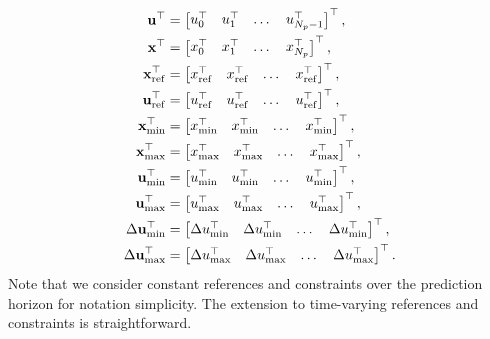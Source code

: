 \documentclass[a4paper,12pt,fleqn]{article}
\newcommand{\varxvec}{\mathbf{x}}
\newcommand{\varuvec}{\mathbf{u}}
\newcommand{\Np}{{N_p}}
\begin{document}
\begin{subequations}
\begin{align}
 \varuvec^\top &= \begin{bmatrix} u_0^\top &u_1^\top &\dots& u_{\Np-1}^\top\end{bmatrix}^\top,\\
 \varxvec^\top &= \begin{bmatrix} x_0^\top &x_1^\top &\dots& x_{\Np}^\top\end{bmatrix}^\top,\\
 {\varxvec}_{\rm ref}^\top &= \begin{bmatrix} x_{\rm ref}^\top &x_{\rm ref}^\top &\dots& x_{\rm ref}^\top\end{bmatrix}^\top,\\
 {\varuvec}_{\rm ref}^\top &= \begin{bmatrix} u_{\rm ref}^\top &u_{\rm ref}^\top &\dots& u_{\rm ref}^\top\end{bmatrix}^\top,\\
 {\varxvec}_{\rm min}^\top &= \begin{bmatrix} x_{\rm min}^\top &x_{\rm min}^\top &\dots& x_{\rm min}^\top\end{bmatrix}^\top,\\
 {\varxvec}_{\rm max}^\top &= \begin{bmatrix} x_{\rm max}^\top &x_{\rm max}^\top &\dots& x_{\rm max}^\top\end{bmatrix}^\top,\\
 {\varuvec}_{\rm min}^\top &= \begin{bmatrix} u_{\rm min}^\top &u_{\rm min}^\top &\dots& u_{\rm min}^\top\end{bmatrix}^\top,\\
 {\varuvec}_{\rm max}^\top &= \begin{bmatrix} u_{\rm max}^\top &u_{\rm max}^\top &\dots& u_{\rm max}^\top\end{bmatrix}^\top,\\
 \Delta{\varuvec}_{\rm min}^\top &= \begin{bmatrix} \Delta u_{\rm min}^\top &\Delta u_{\rm min}^\top &\dots& \Delta u_{\rm min}^\top\end{bmatrix}^\top,\\
 \Delta{\varuvec}_{\rm max}^\top &= \begin{bmatrix} \Delta u_{\rm max}^\top &\Delta u_{\rm max}^\top &\dots& \Delta u_{\rm max}^\top\end{bmatrix}^\top.
 \end{align}
\end{subequations}
Note that we consider constant references and constraints over the prediction horizon for notation simplicity. The extension to time-varying references and constraints is straightforward.
 
\end{document}
